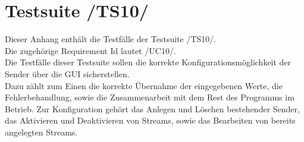 \chapter{Testsuite /TS10/}
Dieser Anhang enthält die Testfälle der Testsuite /TS10/.\\
Die zugehörige Requirement Id lautet /UC10/.\\
\newline
Die Testfälle dieser Testsuite sollen die korrekte Konfigurationsmöglichkeit der Sender über die GUI sicherstellen.\\
Dazu zählt zum Einen die korrekte Übernahme der eingegebenen Werte, die Fehlerbehandlung, sowie die Zusammenarbeit mit dem Rest des Programms im Betrieb.
Zur Konfiguration gehört das Anlegen und Löschen bestehender Sender, das Aktivieren und Deaktivieren von Streams, sowie das Bearbeiten von bereits angelegten Streams.

